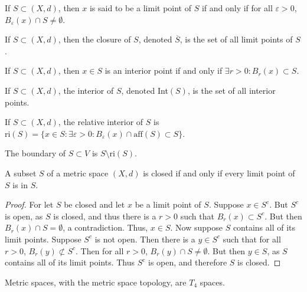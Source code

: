 \documentclass[crop=false,class=book]{standalone}
\begin{document}
\begin{definition}
If $S\subset (X,d)$, then $x$ is said to be a limit point of $S$ if and only if for all $\varepsilon>0$, $B_{\varepsilon}(x)\cap S \ne \emptyset$.
\end{definition}
\begin{definition}
If $S\subset (X,d)$, then the closure of $S$, denoted $\overline{S}$, is the set of all limit points of $S$.
\end{definition}
\begin{definition}
If $S\subset (X,d)$, then $x\in S$ is an interior point if and only if $\exists r>0:B_{r}(x)\subset S$.
\end{definition}
\begin{definition}
If $S\subset (X,d)$, the interior of $S$, denoted Int$(S)$, is the set of all interior points.
\end{definition}
\begin{definition}
If $S\subset (X,d)$, the relative interior of $S$ is $\textrm{ri}(S)= \{x\in S:\exists \varepsilon>0:B_{\varepsilon}(x)\cap \textrm{aff}(S)\subset S\}$.
\end{definition}
\begin{definition}
The boundary of $S\subset V$ is $S\setminus \textrm{ri}(S)$.
\end{definition}
\begin{theorem}
A subset $S$ of a metric space $(X,d)$ is closed if and only if every limit point of $S$ is in $S$.
\end{theorem}
\begin{proof}
For let $S$ be closed and let $x$ be a limit point of $S$. Suppose $x\in S^c$. But $S^c$ is open, as $S$ is closed, and thus there is a $r>0$ such that $B_{r}(x)\subset S^c$. But then $B_{r}(x)\cap S = \emptyset$, a contradiction. Thus, $x\in S$. Now suppose $S$ contains all of its limit points. Suppose $S^c$ is not open. Then there is a $y\in S^c$ such that for all $r>0$, $B_{r}(y)\not \subset S^c$. Then for all $r>0$, $B_{r}(y)\cap S \ne \emptyset$. But then $y\in S$, as $S$ contains all of its limit points. Thus $S^c$ is open, and therefore $S$ is closed.
\end{proof}
\begin{theorem}
Metric spaces, with the metric space topology, are $T_4$ spaces.
\end{theorem}
\end{document}

